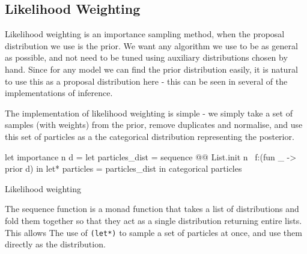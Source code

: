 \subsection{Likelihood Weighting} \label{sec:likelihood-wighting}
		
Likelihood weighting is an importance sampling method, when the proposal distribution we use is the prior. We want any algorithm we use to be as general as possible, and not need to be tuned using auxiliary distributions chosen by hand. Since for any model we can find the prior distribution easily, it is natural to use this as a proposal distribution here - this can be seen in several of the implementations of inference. 
	
The implementation of likelihood weighting is simple - we simply take a set of samples (with weights) from the prior, remove duplicates and normalise, and use this set of particles as a the categorical distribution representing the posterior.
	\begin{listing}[!htb]
		\centering
		\begin{ocamlcode-in}
let importance n d = 
let particles_dist = sequence @@ List.init n ~f:(fun _ -> prior d) in
let* particles = particles_dist in 
categorical particles
		\end{ocamlcode-in}
		\caption{Likelihood weighting}
		\label{lst:imp}
	\end{listing}
	
The sequence function is a monad function that takes a list of distributions and fold them together so that they act as a single distribution returning entire lists. This allows The use of \texttt{(let*)} to sample a set of particles at once, and use them directly as the distribution.
	
